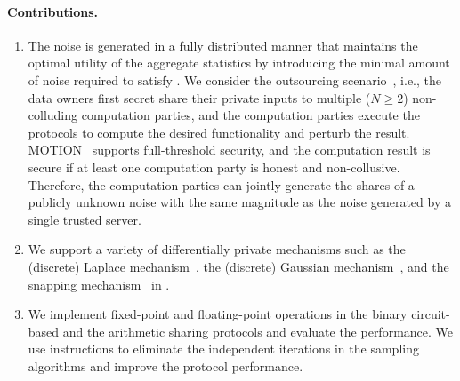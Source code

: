 \paragraph{Contributions.}
\label{para:Contributions}
\begin{enumerate}

    \item The noise is generated in a fully distributed manner that maintains the optimal utility of the aggregate statistics by introducing the minimal amount of noise required to satisfy \differentialprivacy.
          We consider the outsourcing scenario~\cite{kamara2011secure}, i.e., the data owners first secret share their private inputs to multiple ($N \geq 2$) non-colluding computation parties, and the computation parties execute the \smpc protocols to compute the desired functionality and perturb the result. MOTION~\cite{braun2022motion} supports full-threshold security, and the computation result is secure if at least one computation party is honest and non-collusive. Therefore, the computation parties can jointly generate the shares of a publicly unknown noise with the same magnitude as the noise generated by a single trusted server.

    \item We support a variety of differentially private mechanisms such as the (discrete) Laplace mechanism~\cite{chan2012privacy,ghosh2012universally,dwork2014algorithmic}, the (discrete) Gaussian mechanism~\cite{dwork2014algorithmic, canonne2020discrete}, and the snapping mechanism~\cite{mironov2012significance} in \smpc.

    \item We implement fixed-point and floating-point operations in the binary circuit-based and the arithmetic sharing \smpc protocols and evaluate the performance. We use \simd instructions to eliminate the independent iterations in the sampling algorithms and improve the protocol performance.

\end{enumerate}


